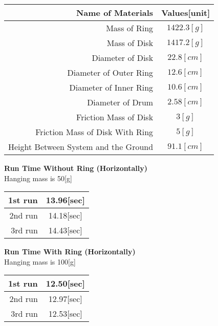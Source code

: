\documentclass[12pt,letterpaper,fleqn]{article}
\begin{document}
\begin{table}[htb]
\begin{center}
	\begin{tabular}{|r||c||}\hline
	Name of Materials & Values[unit]\\\hline\hline
    Mass of Ring & $1422.3[g]$\\\hline
    Mass of Disk & $ 1417.2[g]$ \\\hline\hline
    Diameter of Disk  &$22.8[cm] $\\\hline
    Diameter of Outer Ring & $12.6[cm]$ \\\hline
    Diameter of Inner Ring &$10.6[cm] $   \\\hline 
    Diameter of Drum & $2.58[cm] $\\\hline\hline
    Friction Mass of Disk & $3[g]$\\\hline
    Friction Mass of Disk With Ring & $5[g]$\\\hline\hline
    Height Between System and the Ground & $91.1[cm]$\\\hline
    \end{tabular}
\end{center}
\end{table}
\newpage

\begin{center}
{\large\bf Run Time Without Ring (Horizontally)}
\\ Hanging mass is 50[g]\\
\end{center}

\begin{table}
\begin{center}
\begin{tabular}{|r||c|}
	1st run & 13.96[sec]\\\hline 
	2nd run & 14.18[sec]\\\hline
	3rd run &14.43[sec]\\\hline
\end{tabular}
\end{center}
\end{table}

\begin{center}
{\large\bf Run Time With Ring (Horizontally)}
\\ Hanging mass is 100[g]
\end{center}

\begin{table}
\begin{center}
\begin{tabular}{|r||c|}
	1st run & 12.50[sec]\\\hline 
	2nd run & 12.97[sec]\\\hline
	3rd run & 12.53[sec]\\\hline
\end{tabular}
\end{center}
\end{table}
\end{document}
